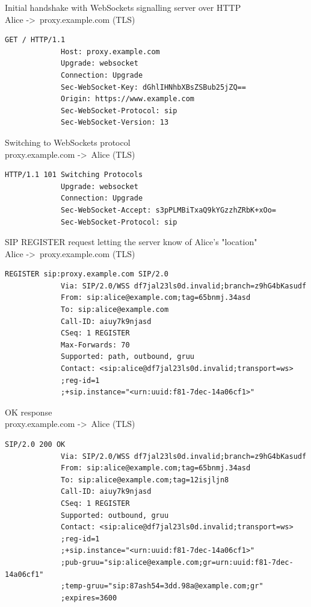 \documentclass[]{report}
\begin{document}
			 Initial handshake with WebSockets signalling server over HTTP \\
			 Alice -\textgreater\ proxy.example.com (TLS)
			 \begin{lstlisting}[tabsize=1,frame=single, basicstyle=\ttfamily\footnotesize]
			 GET / HTTP/1.1
			 Host: proxy.example.com
			 Upgrade: websocket
			 Connection: Upgrade
			 Sec-WebSocket-Key: dGhlIHNhbXBsZSBub25jZQ==
			 Origin: https://www.example.com
			 Sec-WebSocket-Protocol: sip
			 Sec-WebSocket-Version: 13
			 \end{lstlisting}
			 Switching to WebSockets protocol \\
			 proxy.example.com -\textgreater\ Alice (TLS)
			 \begin{lstlisting}[tabsize=1,frame=single, basicstyle=\ttfamily\footnotesize]
			 HTTP/1.1 101 Switching Protocols
			 Upgrade: websocket
			 Connection: Upgrade
			 Sec-WebSocket-Accept: s3pPLMBiTxaQ9kYGzzhZRbK+xOo=
			 Sec-WebSocket-Protocol: sip
			 \end{lstlisting}
			 SIP REGISTER request letting the server know of Alice's "location" \\
			 Alice -\textgreater\ proxy.example.com (TLS)
			 \begin{lstlisting}[tabsize=1,frame=single, basicstyle=\ttfamily\footnotesize]
			 REGISTER sip:proxy.example.com SIP/2.0
			 Via: SIP/2.0/WSS df7jal23ls0d.invalid;branch=z9hG4bKasudf
			 From: sip:alice@example.com;tag=65bnmj.34asd
			 To: sip:alice@example.com
			 Call-ID: aiuy7k9njasd
			 CSeq: 1 REGISTER
			 Max-Forwards: 70
			 Supported: path, outbound, gruu
			 Contact: <sip:alice@df7jal23ls0d.invalid;transport=ws>
			 ;reg-id=1
			 ;+sip.instance="<urn:uuid:f81-7dec-14a06cf1>"
			 \end{lstlisting}
			 OK response \\
			 proxy.example.com -\textgreater\ Alice (TLS)
			 \begin{lstlisting}[tabsize=1,frame=single, basicstyle=\ttfamily\footnotesize]
			 SIP/2.0 200 OK
			 Via: SIP/2.0/WSS df7jal23ls0d.invalid;branch=z9hG4bKasudf
			 From: sip:alice@example.com;tag=65bnmj.34asd
			 To: sip:alice@example.com;tag=12isjljn8
			 Call-ID: aiuy7k9njasd
			 CSeq: 1 REGISTER
			 Supported: outbound, gruu
			 Contact: <sip:alice@df7jal23ls0d.invalid;transport=ws>
			 ;reg-id=1
			 ;+sip.instance="<urn:uuid:f81-7dec-14a06cf1>"
			 ;pub-gruu="sip:alice@example.com;gr=urn:uuid:f81-7dec-14a06cf1"
			 ;temp-gruu="sip:87ash54=3dd.98a@example.com;gr"
			 ;expires=3600
			 \end{lstlisting}
			 
\end{document}
